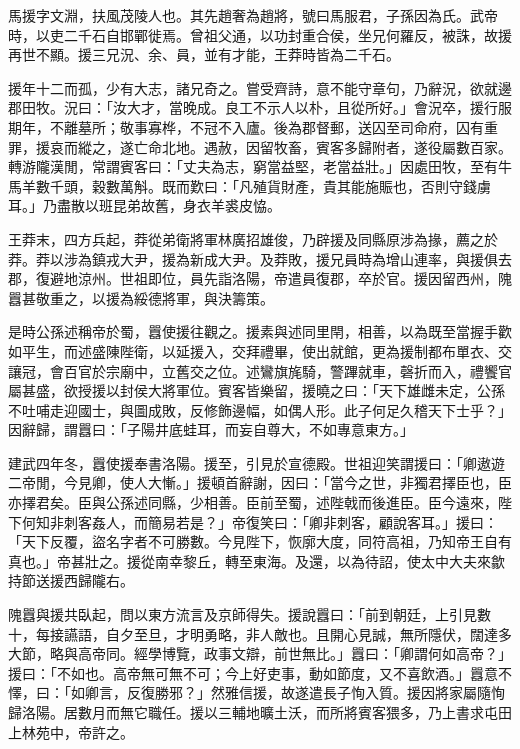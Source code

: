 
\begin{pinyinscope}
馬援字文淵，扶風茂陵人也。其先趙奢為趙將，號曰馬服君，子孫因為氏。武帝時，以吏二千石自邯鄲徙焉。曾祖父通，以功封重合侯，坐兄何羅反，被誅，故援再世不顯。援三兄況、余、員，並有才能，王莽時皆為二千石。

援年十二而孤，少有大志，諸兄奇之。嘗受齊詩，意不能守章句，乃辭況，欲就邊郡田牧。況曰：「汝大才，當晚成。良工不示人以朴，且從所好。」會況卒，援行服期年，不離墓所；敬事寡桦，不冠不入廬。後為郡督郵，送囚至司命府，囚有重罪，援哀而縱之，遂亡命北地。遇赦，因留牧畜，賓客多歸附者，遂役屬數百家。轉游隴漢閒，常謂賓客曰：「丈夫為志，窮當益堅，老當益壯。」因處田牧，至有牛馬羊數千頭，穀數萬斛。既而歎曰：「凡殖貨財產，貴其能施賑也，否則守錢虜耳。」乃盡散以班昆弟故舊，身衣羊裘皮恊。

王莽末，四方兵起，莽從弟衛將軍林廣招雄俊，乃辟援及同縣原涉為掾，薦之於莽。莽以涉為鎮戎大尹，援為新成大尹。及莽敗，援兄員時為增山連率，與援俱去郡，復避地涼州。世祖即位，員先詣洛陽，帝遣員復郡，卒於官。援因留西州，隗囂甚敬重之，以援為綏德將軍，與決籌策。

是時公孫述稱帝於蜀，囂使援往觀之。援素與述同里閈，相善，以為既至當握手歡如平生，而述盛陳陛衛，以延援入，交拜禮畢，使出就館，更為援制都布單衣、交讓冠，會百官於宗廟中，立舊交之位。述鸞旗旄騎，警蹕就車，磬折而入，禮饗官屬甚盛，欲授援以封侯大將軍位。賓客皆樂留，援曉之曰：「天下雄雌未定，公孫不吐哺走迎國士，與圖成敗，反修飾邊幅，如偶人形。此子何足久稽天下士乎？」因辭歸，謂囂曰：「子陽井底蛙耳，而妄自尊大，不如專意東方。」

建武四年冬，囂使援奉書洛陽。援至，引見於宣德殿。世祖迎笑謂援曰：「卿遨遊二帝閒，今見卿，使人大慚。」援頓首辭謝，因曰：「當今之世，非獨君擇臣也，臣亦擇君矣。臣與公孫述同縣，少相善。臣前至蜀，述陛戟而後進臣。臣今遠來，陛下何知非刺客姦人，而簡易若是？」帝復笑曰：「卿非刺客，顧說客耳。」援曰：「天下反覆，盜名字者不可勝數。今見陛下，恢廓大度，同符高祖，乃知帝王自有真也。」帝甚壯之。援從南幸黎丘，轉至東海。及還，以為待詔，使太中大夫來歙持節送援西歸隴右。

隗囂與援共臥起，問以東方流言及京師得失。援說囂曰：「前到朝廷，上引見數十，每接讌語，自夕至旦，才明勇略，非人敵也。且開心見誠，無所隱伏，闊達多大節，略與高帝同。經學博覽，政事文辯，前世無比。」囂曰：「卿謂何如高帝？」援曰：「不如也。高帝無可無不可；今上好吏事，動如節度，又不喜飲酒。」囂意不懌，曰：「如卿言，反復勝邪？」然雅信援，故遂遣長子恂入質。援因將家屬隨恂歸洛陽。居數月而無它職任。援以三輔地曠土沃，而所將賓客猥多，乃上書求屯田上林苑中，帝許之。


\end{pinyinscope}
